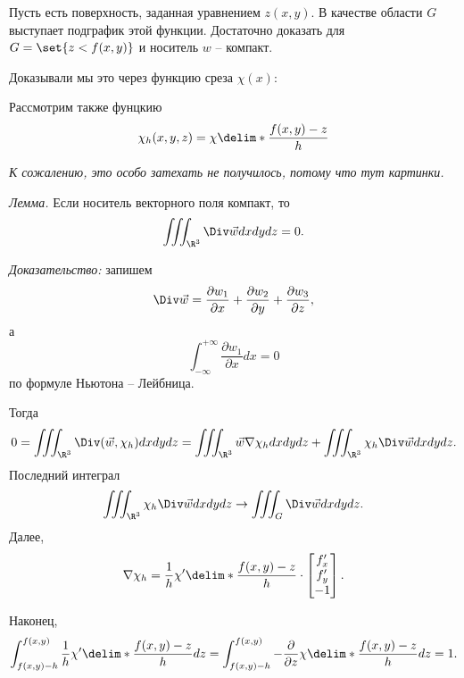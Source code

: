 Пусть есть поверхность, заданная уравнением $z(x, y)$. В качестве области $G$ выступает подграфик этой функции. Достаточно доказать для $G = \set{z < f(x, y)}$ и носитель $w$ -- компакт.

Доказывали мы это через функцию среза $\chi (x)$:

Рассмотрим также фунцкию
\begin{equation*}
    \chi_h(x, y, z) = \chi\delim*{\frac{f(x, y) - z}{h}}
\end{equation*} 

\textit{К сожалению, это особо затехать не получилось, потому что тут картинки.}

\textit{Лемма.} Если носитель векторного поля компакт, то 
\begin{equation*}
    \iiint_{\R^3} \Div \vec{w} dxdydz = 0.
\end{equation*}

\textit{Доказательство:} запишем
\begin{equation*}
    \Div \vec{w} = \frac{\partial w_1}{\partial x} + \frac{\partial w_2}{\partial y} + \frac{\partial w_3}{\partial z},
\end{equation*}
а
\begin{equation*}
    \int_{-\infty}^{+\infty} \frac{\partial w_1}{\partial x} dx = 0
\end{equation*}
по формуле Ньютона -- Лейбница.

Тогда
\begin{equation*}
    0 = \iiint_{\R^3} \Div(\vec{w}, \chi_h) dxdydz = \iiint_{\R^3} \vec{w} \nabla \chi_h dxdydz + \iiint_{\R^3} \chi_h \Div \vec{w} dxdydz.
\end{equation*}
Последний интеграл
\begin{equation*}
    \iiint_{\R^3} \chi_h \Div \vec{w} dxdydz \to \iiint_{G} \Div \vec{w} dxdydz.
\end{equation*}
Далее,
\begin{equation*}
    \nabla \chi_h = \frac{1}{h}\chi'\delim*{\frac{f(x, y) - z}{h}}\cdot\begin{bmatrix}
        f'_x \\ f'_y \\ -1
    \end{bmatrix}.
\end{equation*}

Наконец,
\begin{equation*}
    \int_{f(x, y) - h}^{f(x, y)} \frac{1}{h}\chi'\delim*{\frac{f(x, y) - z}{h}}dz = \int_{f(x, y) - h}^{f(x, y)} -\frac{\partial}{\partial z}\chi\delim*{\frac{f(x, y) - z}{h}}dz = 1.
\end{equation*}

